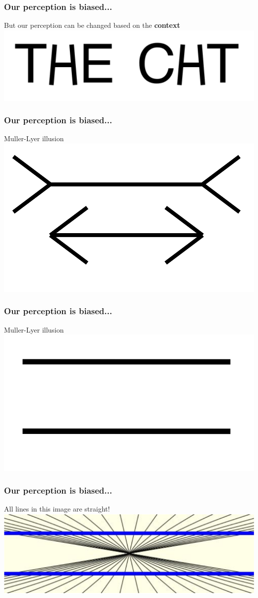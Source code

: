 \documentclass{beamer}
\begin{document}
\begin{frame}
\frametitle{Our perception is biased...}
But our perception can be changed based on the \textbf{context}
\centering
\includegraphics[width=0.8\linewidth]{image/perception5}
\end{frame}

\begin{frame}
\frametitle{Our perception is biased...}
Muller-Lyer illusion 
\centering
\includegraphics[width=0.8\linewidth]{image/perception8}
\end{frame}

\begin{frame}
\frametitle{Our perception is biased...}
Muller-Lyer illusion 
\centering
\includegraphics[width=0.8\linewidth]{image/perception7}
\end{frame}

\begin{frame}
\frametitle{Our perception is biased...}
All lines in this image are straight!
\centering
\includegraphics[width=1\linewidth]{image/perception9}
\end{frame}
\end{document}

